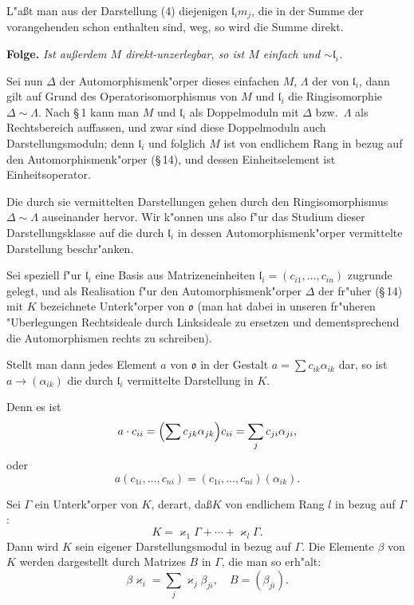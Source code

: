 \documentclass[12pt,a4paper]{article}
\theoremstyle{plain}
\begin{document}
L"a\ss t man aus der Darstellung (4) diejenigen $\mathfrak{l}_im_j$, die in der Summe der vorangehenden schon enthalten sind, weg, so wird die Summe direkt.

\medskip\noindent\textbf{Folge.}
\textit{Ist au\ss erdem $M$ direkt-unzerlegbar, so ist $M$ einfach und $\sim \mathfrak{l}_i$.}

Sei nun $\Delta$ der Automorphismenk"orper dieses einfachen $M$, $\Lambda$ der von $\mathfrak{l}_i$, dann gilt auf Grund des Operatorisomorphismus von $M$ und $\mathfrak{l}_i$ die Ringisomorphie $\Delta \sim \Lambda$. Nach \S\,1 kann man $M$ und $\mathfrak{l}_i$ als Doppelmoduln mit $\Delta$ bzw.\ $\Lambda$ als Rechtsbereich auffassen, und zwar sind diese Doppelmoduln auch Darstellungsmoduln; denn $\mathfrak{l}_i$ und folglich $M$ ist von endlichem Rang in bezug auf den Automorphismenk"orper (\S\,14), und dessen Einheitselement ist Einheitsoperator.

Die durch sie vermittelten Darstellungen gehen durch den Ringisomorphismus $\Delta \sim \Lambda$ auseinander hervor. Wir k"onnen uns also f"ur das Studium dieser Darstellungsklasse auf die durch $\mathfrak{l}_i$ in dessen Automorphismenk"orper vermittelte Darstellung beschr"anken.

Sei speziell f"ur $\mathfrak{l}_i$ eine Basis aus Matrizeneinheiten $\mathfrak{l}_i = (c_{i1},\ldots,c_{in})$ zugrunde gelegt, und als Realisation f"ur den Automorphismenk"orper $\Delta$ der fr"uher (\S\,14) mit $K$ bezeichnete Unterk"orper von $\mathfrak{o}$ (man hat dabei in unseren fr"uheren "Uberlegungen Rechtsideale durch Linksideale zu ersetzen und dementsprechend die Automorphismen rechts zu schreiben).

Stellt man dann jedes Element $a$ von $\mathfrak{o}$ in der Gestalt $a = \sum c_{ik}\alpha_{ik}$ dar, so ist $a \to (\alpha_{ik})$ die durch $\mathfrak{l}_i$ vermittelte Darstellung in $K$.

Denn es ist
\[
a \cdot c_{ii} = \Bigl(\sum c_{jk}\alpha_{jk}\Bigr)c_{ii} = \sum_j c_{ji}\alpha_{ji},
\]
oder
\[
a(c_{1i},\ldots,c_{ni}) = (c_{1i},\ldots,c_{ni})(\alpha_{ik}).
\]

Sei $\Gamma$ ein Unterk"orper von $K$, derart, da\ss $K$ von endlichem Rang $l$ in bezug auf $\Gamma$:
\[
K = \varkappa_1\Gamma + \cdots + \varkappa_l\Gamma.
\]
Dann wird $K$ sein eigener Darstellungsmodul in bezug auf $\Gamma$. Die Elemente $\beta$ von $K$ werden dargestellt durch Matrizes $B$ in $\Gamma$, die man so erh"alt:
\[
\beta\varkappa_i = \sum_j \varkappa_j\beta_{ji},\quad B = (\beta_{ji}).
\]
\end{document}
